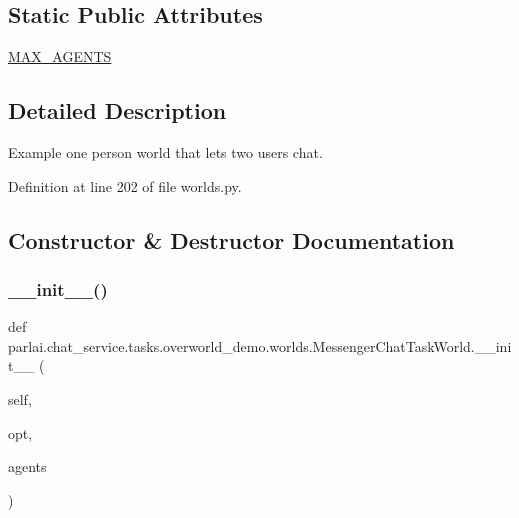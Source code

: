 \subsection*{Static Public Attributes}
\begin{DoxyCompactItemize}
\item 
\hyperlink{classparlai_1_1chat__service_1_1tasks_1_1overworld__demo_1_1worlds_1_1MessengerChatTaskWorld_a2aa585a7d925a32f04ec3f4901968fa7}{M\+A\+X\+\_\+\+A\+G\+E\+N\+TS}
\end{DoxyCompactItemize}


\subsection{Detailed Description}
\begin{DoxyVerb}Example one person world that lets two users chat.
\end{DoxyVerb}
 

Definition at line 202 of file worlds.\+py.



\subsection{Constructor \& Destructor Documentation}
\mbox{\label{classparlai_1_1chat__service_1_1tasks_1_1overworld__demo_1_1worlds_1_1MessengerChatTaskWorld_a4092cb3b80c2af7884b5368db1803433}} 
\subsubsection{\texorpdfstring{\+\_\+\+\_\+init\+\_\+\+\_\+()}{\_\_init\_\_()}}
{\footnotesize\ttfamily def parlai.\+chat\+\_\+service.\+tasks.\+overworld\+\_\+demo.\+worlds.\+Messenger\+Chat\+Task\+World.\+\_\+\+\_\+init\+\_\+\+\_\+ (\begin{DoxyParamCaption}\item[{}]{self,  }\item[{}]{opt,  }\item[{}]{agents }\end{DoxyParamCaption})}



